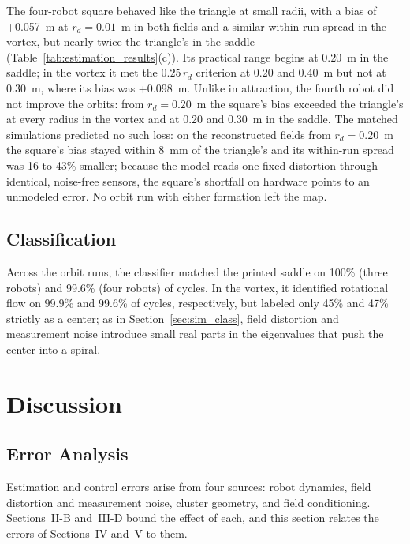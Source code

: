 \documentclass[lettersize,journal]{IEEEtran}
\newcommand{\rev}[1]{#1}
\begin{document}
The four-robot square behaved like the triangle at small radii, with a bias of \rev{+0.057}~m at $r_d = 0.01$~m in both fields and a similar within-run spread in the vortex, but nearly twice the triangle's in the saddle (Table~\ref{tab:estimation_results}(c)). Its practical range begins at \rev{0.20}~m in the saddle; in the vortex it met the $0.25\,r_d$ criterion at 0.20 and 0.40~m but not at 0.30~m, where its bias was \rev{+0.098}~m. Unlike in attraction, the fourth robot did not improve the orbits: from $r_d = 0.20$~m the square's bias exceeded the triangle's at every radius in the vortex and at 0.20 and 0.30~m in the saddle. The matched simulations predicted no such loss: on the reconstructed fields from $r_d = 0.20$~m the square's bias stayed within \rev{8}~mm of the triangle's and its within-run spread was \rev{16} to \rev{43}\% smaller; because the model reads one fixed distortion through identical, noise-free sensors, the square's shortfall on hardware points to an unmodeled error. No orbit run with either formation left the map.

\subsection{Classification}

Across the orbit runs, the classifier matched the printed saddle on \rev{100}\% (three robots) and \rev{99.6}\% (four robots) of cycles. In the vortex, it identified rotational flow on \rev{99.9}\% and \rev{99.6}\% of cycles, respectively, but labeled only \rev{45}\% and \rev{47}\% strictly as a center; as in Section~\ref{sec:sim_class}, field distortion and measurement noise introduce small real parts in the eigenvalues that push the center into a spiral.




\section{Discussion}

\subsection{Error Analysis}

Estimation and control errors arise from four sources: robot dynamics, field distortion and measurement noise, cluster geometry, and field conditioning. Sections~II-B and~III-D bound the effect of each, and this section relates the errors of Sections~IV and~V to them.
\end{document}
